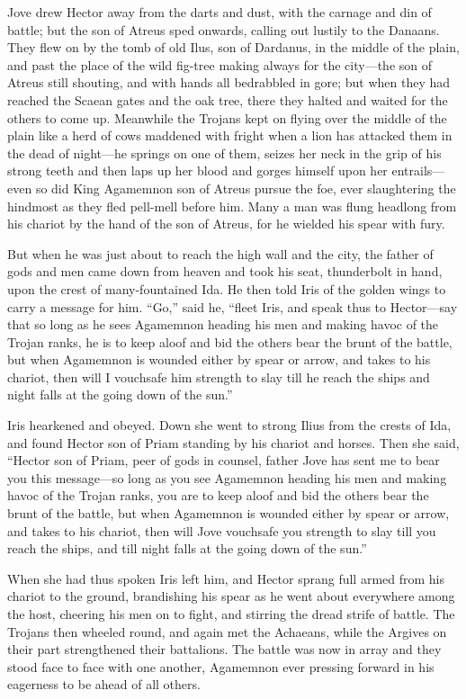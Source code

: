 Jove drew Hector away from the darts and dust, with the carnage and din of
battle; but the son of Atreus sped onwards, calling out lustily to the
Danaans. They flew on by the tomb of old Ilus, son of Dardanus, in the
middle of the plain, and past the place of the wild fig-tree making always
for the city—the son of Atreus still shouting, and with hands all
bedrabbled in gore; but when they had reached the Scaean gates and the oak
tree, there they halted and waited for the others to come up. Meanwhile
the Trojans kept on flying over the middle of the plain like a herd of
cows maddened with fright when a lion has attacked them in the dead of
night—he springs on one of them, seizes her neck in the grip of his
strong teeth and then laps up her blood and gorges himself upon her
entrails—even so did King Agamemnon son of Atreus pursue the foe,
ever slaughtering the hindmost as they fled pell-mell before him. Many a
man was flung headlong from his chariot by the hand of the son of Atreus,
for he wielded his spear with fury.

But when he was just about to reach the high wall and the city, the father
of gods and men came down from heaven and took his seat, thunderbolt in
hand, upon the crest of many-fountained Ida. He then told Iris of the
golden wings to carry a message for him. “Go,” said he, “fleet Iris, and
speak thus to Hector—say that so long as he sees Agamemnon heading
his men and making havoc of the Trojan ranks, he is to keep aloof and bid
the others bear the brunt of the battle, but when Agamemnon is wounded
either by spear or arrow, and takes to his chariot, then will I vouchsafe
him strength to slay till he reach the ships and night falls at the going
down of the sun.”

Iris hearkened and obeyed. Down she went to strong Ilius from the crests
of Ida, and found Hector son of Priam standing by his chariot and horses.
Then she said, “Hector son of Priam, peer of gods in counsel, father Jove
has sent me to bear you this message—so long as you see Agamemnon
heading his men and making havoc of the Trojan ranks, you are to keep
aloof and bid the others bear the brunt of the battle, but when Agamemnon
is wounded either by spear or arrow, and takes to his chariot, then will
Jove vouchsafe you strength to slay till you reach the ships, and till
night falls at the going down of the sun.”

When she had thus spoken Iris left him, and Hector sprang full armed from
his chariot to the ground, brandishing his spear as he went about
everywhere among the host, cheering his men on to fight, and stirring the
dread strife of battle. The Trojans then wheeled round, and again met the
Achaeans, while the Argives on their part strengthened their battalions.
The battle was now in array and they stood face to face with one another,
Agamemnon ever pressing forward in his eagerness to be ahead of all
others.

